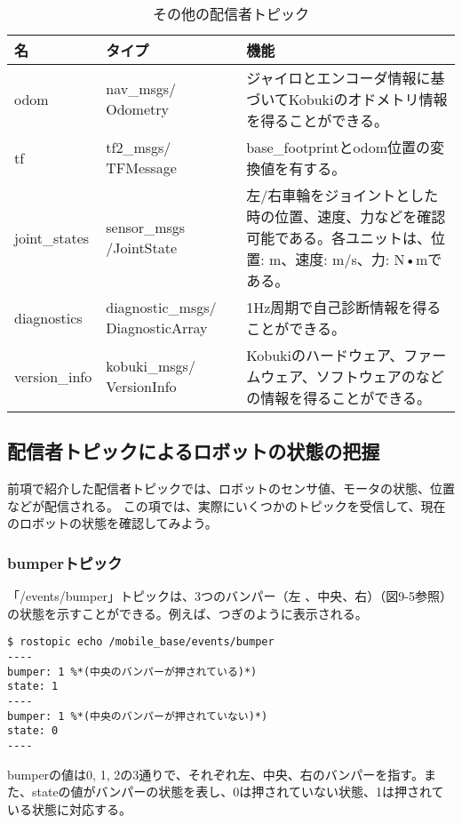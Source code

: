 \begin{table}[htp]
\centering
\begin{tabular}{p{2cm} p{3cm} p{8cm}}
\toprule
\textbf{名} & \textbf{タイプ} & \textbf{機能}\\
\midrule
odom & nav\_msgs/ Odometry & ジャイロとエンコーダ情報に基づいてKobukiのオドメトリ情報を得ることができる。\\
tf & tf2\_msgs/ TFMessage & base\_footprintとodom位置の変換値を有する。\\
joint\_states & sensor\_msgs /JointState & 左/右車輪をジョイントとした時の位置、速度、力などを確認可能である。各ユニットは、位置: m、速度: m/s、力: N•mである。\\
diagnostics & diagnostic\_msgs/ DiagnosticArray & 1Hz周期で自己診断情報を得ることができる。\\
version\_info & kobuki\_msgs/ VersionInfo & Kobukiのハードウェア、ファームウェア、ソフトウェアのなどの情報を得ることができる。\\
\bottomrule
\end{tabular}
\caption{その他の配信者トピック}
\end{table}

\subsection{配信者トピックによるロボットの状態の把握}

前項で紹介した配信者トピックでは、ロボットのセンサ値、モータの状態、位置などが配信される。  この項では、実際にいくつかのトピックを受信して、現在のロボットの状態を確認してみよう。

\subsubsection{bumperトピック}

「/events/bumper」トピックは、3つのバンパー（左  、中央、右）（図9-5参照）の状態を示すことができる。例えば、つぎのように表示される。

\begin{lstlisting}[language=ROS]
$ rostopic echo /mobile_base/events/bumper
----
bumper: 1 %*(中央のバンパーが押されている)*)
state: 1
----
bumper: 1 %*(中央のバンパーが押されていない)*)
state: 0
----
\end{lstlisting}

bumperの値は0, 1, 2の3通りで、それぞれ左、中央、右のバンパーを指す。また、stateの値がバンパーの状態を表し、0は押されていない状態、1は押されている状態に対応する。

